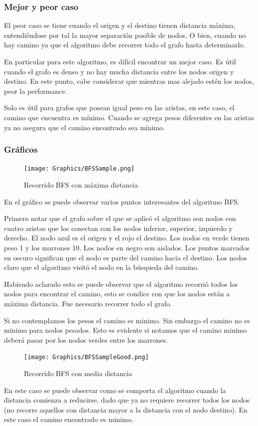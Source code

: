 \subsubsection{Mejor y peor caso}
El peor caso se tiene cuando el origen y el destino tienen distancia máxima, entendiéndose por tal la mayor separación posible de nodos. O bien, cuando no hay camino ya que el algoritmo debe recorrer todo el grafo hasta determinarlo.

En particular para este algoritmo, es difícil encontrar un mejor caso. Es útil cuando el grafo es denso y no hay mucha distancia entre los nodos origen y destino. En este punto, cabe considerar que mientras mas alejado estén los nodos, peor la performance.

Solo es útil para grafos que posean igual peso en las aristas, en este caso, el camino que encuentra es mínimo. Cuando se agrega pesos diferentes en las aristas ya no asegura que el camino encontrado sea mínimo.


\subsubsection{Gráficos}
\begin{figure}[h]
\centering
\texttt{[image: Graphics/BFSSample.png]}
\caption{Recorrido BFS con máxima distancia}
\end{figure}
En el gráfico se puede observar varios puntos interesantes del algoritmo BFS. 

Primero notar que el grafo sobre el que se aplicó el algoritmo son nodos con cuatro aristas que los conectan con los nodos inferior, superior, izquierdo y derecho. El nodo azul es el origen y el rojo el destino. Los nodos en verde tienen peso 1 y los marrones 10. Los nodos en negro son aislados. 
Los puntos marcados en oscuro significan que el nodo es parte del camino hacia el destino. Los nodos claro que el algoritmo visitó el nodo en la búsqueda del camino.

Habiendo aclarado esto se puede observar que el algoritmo recorrió todos los nodos para encontrar el camino, esto se condice con que los nodos están a máxima distancia. Fue necesario recorrer todo el grafo. 

Si no contemplamos los pesos el camino es minimo. Sin embargo el camino no es minimo para nodos pesados. Esto es evidente si notamos que el camino minimo deberá pasar por los nodos verdes entre los marrones. 

\begin{figure}[H]
\centering
\texttt{[image: Graphics/BFSSampleGood.png]}
\caption{Recorrido BFS con media distancia}
\end{figure}
En este caso se puede observar como se comporta el algoritmo cuando la distancia comienza a reducirse, dado que ya no requiere recorrer todos los nodos (no recorre aquellos con distancia mayor a la distancia con el nodo destino).
En este caso el camino encontrado es minimo.
\newpage

